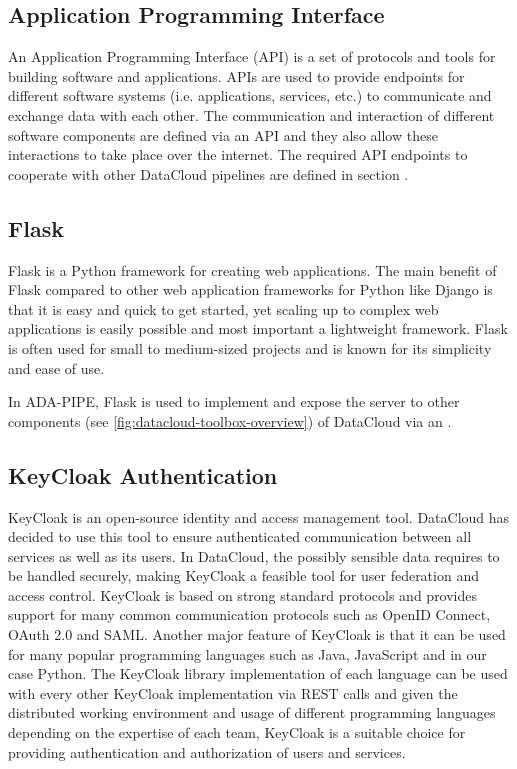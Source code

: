 \documentclass{article}
\begin{document}
        \subsection{Application Programming Interface}
        \label{sec:api-server}

            An Application Programming Interface (API) \cite{redhatWhatRESTAPI} is a set of protocols and tools for building software and applications.
            APIs are used to provide endpoints for different software systems (i.e. applications, services, etc.) to communicate and exchange data with each other.
            The communication and interaction of different software components are defined via an API and they also allow these interactions to take place over the internet.
            The required API endpoints to cooperate with other DataCloud pipelines are defined in section .

        \subsection{Flask}
        \label{sec:flask-server}

            Flask \cite{WelcomeFlaskFlask} is a Python framework for creating web applications.
            The main benefit of Flask compared to other web application frameworks for Python like Django is that it is easy and quick to get started, yet scaling up to complex web applications is easily possible and most important a lightweight framework.
            Flask is often used for small to medium-sized projects and is known for its simplicity and ease of use.

            In ADA-PIPE, Flask is used to implement and expose the  server to other components (see \ref{fig:datacloud-toolbox-overview}) of DataCloud via an .

        \subsection{KeyCloak Authentication}
        \label{sec:keycloak-server}

            KeyCloak \cite{keycloakDocumentationKeycloak} is an open-source identity and access management tool.
            DataCloud has decided to use this tool to ensure authenticated communication between all services as well as its users.
            In DataCloud, the possibly sensible data requires to be handled securely, making KeyCloak a feasible tool for user federation and access control. KeyCloak is based on strong standard protocols and provides support for many common communication protocols such as OpenID Connect, OAuth 2.0 and SAML.
            Another major feature of KeyCloak is that it can be used for many popular programming languages such as Java, JavaScript and in our case Python. The KeyCloak library implementation of each language can be used with every other KeyCloak implementation via REST calls and given the distributed working environment and usage of different programming languages depending on the expertise of each team, KeyCloak is a suitable choice for providing authentication and authorization of users and services.
\end{document}
